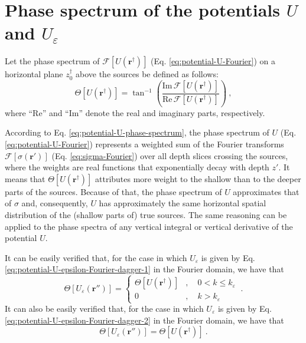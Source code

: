 \section{Phase spectrum of the potentials $U$ and $U_{\varepsilon}$}
\label{app:potential-U-min-phase}

Let the phase spectrum \citep[e.g.,][p. 261]{blakely1996} of  
$\mathcal{F} [ U(\mathbf{r}^{\dagger}) ]$ (Eq. \ref{eq:potential-U-Fourier}) 
on a horizontal plane $z^{\dagger}_{0}$ above the sources be defined as follows:
\begin{equation}
	\Theta [ U(\mathbf{r}^{\dagger}) ] = \tan^{-1} \left( 
	\frac{\text{Im} \, \mathcal{F} [ U(\mathbf{r}^{\dagger}) ]}{\text{Re} \, \mathcal{F} [ U(\mathbf{r}^{\dagger}) ]} 
	\right) \: ,
	\label{eq:potential-U-phase-spectrum}
\end{equation}
where ``$\text{Re}$'' and ``$\text{Im}$'' denote the real and imaginary parts, respectively.

According to Eq. \ref{eq:potential-U-phase-spectrum}, the phase spectrum of $U$ (Eq. \ref{eq:potential-U-Fourier}) 
represents a weighted sum of the Fourier transforms $\mathcal{F} [ \sigma(\mathbf{r}') ]$
(Eq. \ref{eq:sigma-Fourier}) over all depth slices crossing the sources,
where the weights are real functions that exponentially decay with depth $z'$.
It means that $\Theta [ U(\mathbf{r}^{\dagger}) ]$ attributes more weight to the shallow than to the deeper parts of the sources. 
Because of that, the phase spectrum of $U$ approximates that of $\sigma$ and, consequently, 
$U$ has approximately the same horizontal spatial distribution of the (shallow parts of) true sources.
The same reasoning can be applied to the phase spectra of any vertical integral or vertical derivative of the potential $U$.

It can be easily verified that, for the case in which $U_{\varepsilon}$ is given by Eq. 
\ref{eq:potential-U-epsilon-Fourier-dagger-1} in the Fourier domain, we have that
\begin{equation}
	\Theta [ U_{\varepsilon}(\mathbf{r}'') ] = \begin{cases}
		\Theta [ U(\mathbf{r}^{\dagger}) ] & , \quad 0 < k \le k_{\varepsilon} \\
		0 & , \quad k > k_{\varepsilon}
	\end{cases} \: .
	\label{eq:potential-U-epsilon-1-phase-spectrum}
\end{equation}
It can also be easily verified that, for the case in which $U_{\varepsilon}$ is given by Eq. 
\ref{eq:potential-U-epsilon-Fourier-dagger-2} in the Fourier domain, we have that
\begin{equation}
	\Theta [ U_{\varepsilon}(\mathbf{r}'') ] = \Theta [ U(\mathbf{r}^{\dagger}) ] \: .
	\label{eq:potential-U-epsilon-2-phase-spectrum}
\end{equation}